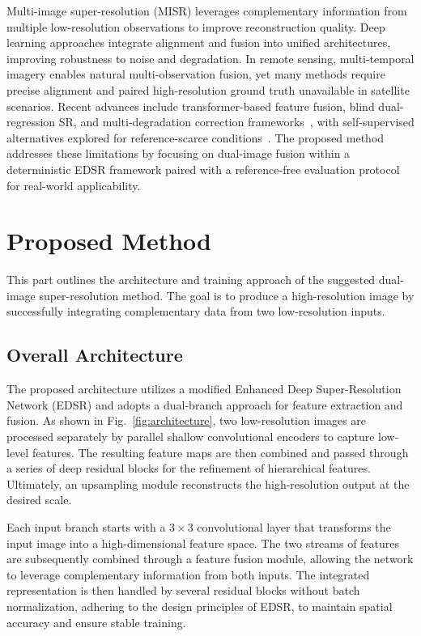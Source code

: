 \documentclass[conference]{IEEEtran}
\begin{document}
Multi-image super-resolution (MISR) leverages complementary information from multiple low-resolution observations to improve reconstruction quality. Deep learning approaches integrate alignment and fusion into unified architectures, improving robustness to noise and degradation. In remote sensing, multi-temporal imagery enables natural multi-observation fusion, yet many methods require precise alignment and paired high-resolution ground truth unavailable in satellite scenarios. Recent advances include transformer-based feature fusion, blind dual-regression SR, and multi-degradation correction frameworks~\cite{zhang2022trmisr, lei2022idrn, liu2024multideg}, with self-supervised alternatives explored for reference-scarce conditions~\cite{nguyen2023l1bsr, wang2025unsupervised, sun2025variational}. The proposed method addresses these limitations by focusing on dual-image fusion within a deterministic EDSR framework paired with a reference-free evaluation protocol for real-world applicability.

\section{Proposed Method}

This part outlines the architecture and training approach of the suggested dual-image super-resolution method. The goal is to produce a high-resolution image by successfully integrating complementary data from two low-resolution inputs.

\subsection{Overall Architecture}

The proposed architecture utilizes a modified Enhanced Deep Super-Resolution Network (EDSR) and adopts a dual-branch approach for feature extraction and fusion. As shown in Fig.~\ref{fig:architecture}, two low-resolution images are processed separately by parallel shallow convolutional encoders to capture low-level features. The resulting feature maps are then combined and passed through a series of deep residual blocks for the refinement of hierarchical features. Ultimately, an upsampling module reconstructs the high-resolution output at the desired scale.

Each input branch starts with a $3 \times 3$ convolutional layer that transforms the input image into a high-dimensional feature space. The two streams of features are subsequently combined through a feature fusion module, allowing the network to leverage complementary information from both inputs. The integrated representation is then handled by several residual blocks without batch normalization, adhering to the design principles of EDSR, to maintain spatial accuracy and ensure stable training.
\end{document}
